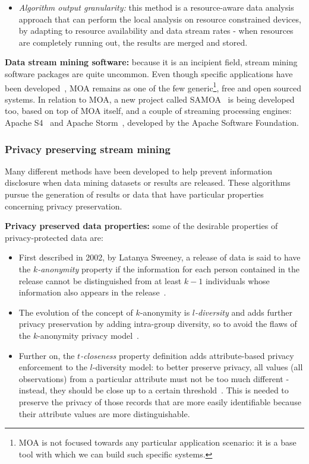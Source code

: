 \begin{itemize}
\begin{itemize}
		\item \textit{Algorithm output granularity:} this method is a resource-aware data analysis approach that can perform the local analysis on resource constrained devices, by adapting to resource availability and data stream rates - when resources are completely running out, the results are merged and stored.
	\end{itemize}
\end{itemize}

\textbf{Data stream mining software:} because it is an incipient field, stream mining software packages are quite uncommon. Even though specific applications have been developed~\cite{mineFleet}, MOA remains as one of the few generic\footnote{MOA is not focused towards any particular application scenario: it is a base tool with which we can build such specific systems.}, free and open sourced systems.
In relation to MOA, a new project called SAMOA~\cite{samoa} is being developed too, based on top of MOA itself, and a couple of streaming processing engines: Apache S4~\cite{apacheS4} and Apache Storm~\cite{apacheStorm}, developed by the Apache Software Foundation.

\subsubsection{Privacy preserving stream mining}

Many different methods have been developed to help prevent information disclosure when data mining datasets or results are released. These algorithms pursue the generation of results or data that have particular properties concerning privacy preservation.

\textbf{Privacy preserved data properties:} some of the desirable properties of privacy-protected data are:
\begin{itemize}
	\item First described in 2002, by Latanya Sweeney, a release of data is said to have the \textit{$k$-anonymity} property if the information for each person contained in the release cannot be distinguished from at least $k-1$ individuals whose information also appears in the release~\cite{kAnon}.
	
	\item The evolution of the concept of $k$-anonymity is \textit{$l$-diversity} and adds further privacy preservation by adding intra-group diversity, so to avoid the flaws of the $k$-anonymity privacy model~\cite{lDiversity}.
	
	\item Further on, the \textit{$t$-closeness} property definition adds attribute-based privacy enforcement to the $l$-diversity model: to better preserve privacy, all values (all observations) from a particular attribute must not be too much different - instead, they should be close up to a certain threshold~\cite{tCloseness}. This is needed to preserve the privacy of those records that are more easily identifiable because their attribute values are more distinguishable.
\end{itemize}

